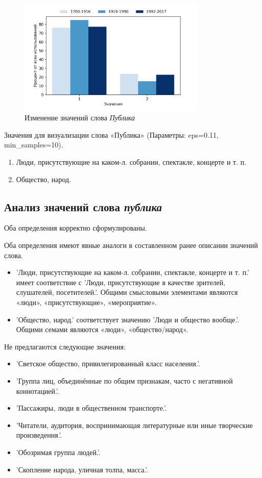 \begin{figure}[H]
	\centering
	\includegraphics[width=0.8\textwidth]{img/visualizations/publika_minimal}
	\caption{Изменение значений слова \textit{Публика}}
	\label{fig:Публика}
\end{figure}

Значения для визуализации слова «Публика» (Параметры: eps=0.11, min\_samples=10).

\begin{enumerate}
    \item Люди, присутствующие на каком-л. собрании, спектакле, концерте и т. п.
    \item Общество, народ.
\end{enumerate}

\subsection*{Анализ значений слова \textit{публика}}

Оба определения корректно сформулированы.

Оба определения имеют явные аналоги в составленном ранее описании значений слова.

\begin{itemize}
    \item ’Люди, присутствующие на каком-л. собрании, спектакле, концерте и т. п.’ имеет соответствие с
    ’Люди, присутствующие в качестве зрителей, слушателей, посетителей.’.
    Общими смысловыми элементами являются «люди», «присутствующие», «мероприятие».

    \item ’Общество, народ.’ соответствует значению ’Люди и общество вообще.’.
    Общими семами являются «люди», «общество/народ».
\end{itemize}

Не предлагаются следующие значения:
\begin{itemize}
    \item ’Светское общество, привилегированный класс населения.’.
    \item ’Группа лиц, объединённые по общим признакам, часто с негативной коннотацией.’.
    \item ’Пассажиры, люди в общественном транспорте.’.
    \item ’Читатели, аудитория, воспринимающая литературные или иные творческие произведения.’.
    \item ’Обозримая группа людей.’.
    \item ’Скопление народа, уличная толпа, масса.’.
\end{itemize}

